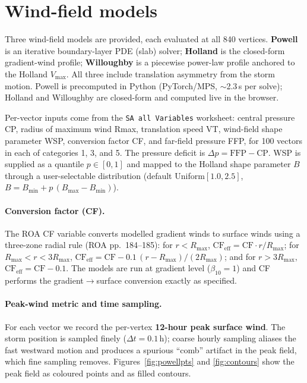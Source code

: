 \documentclass[11pt]{article}
\begin{document}
\section{Wind-field models}
Three wind-field models are provided, each evaluated at all 840 vertices.
\textbf{Powell} is an iterative boundary-layer PDE (slab) solver;
\textbf{Holland} is the closed-form gradient-wind profile; \textbf{Willoughby}
is a piecewise power-law profile anchored to the Holland $V_{\max}$. All three
include translation asymmetry from the storm motion. Powell is precomputed in
Python (PyTorch/MPS, $\sim$2.3\,s per solve); Holland and Willoughby are
closed-form and computed live in the browser.

Per-vector inputs come from the \texttt{SA all Variables} worksheet: central
pressure CP, radius of maximum wind Rmax, translation speed VT, wind-field shape
parameter WSP, conversion factor CF, and far-field pressure FFP, for 100 vectors
in each of categories 1, 3, and 5. The pressure deficit is $\Delta p=\text{FFP}-\text{CP}$.
WSP is supplied as a quantile $p\in[0,1]$ and mapped to the Holland shape
parameter $B$ through a user-selectable distribution (default Uniform$[1.0,2.5]$,
$B=B_{\min}+p\,(B_{\max}-B_{\min})$).

\paragraph{Conversion factor (CF).}
The ROA CF variable converts modelled gradient winds to surface winds using a
three-zone radial rule (ROA pp.~184--185): for $r<R_{\max}$,
$\text{CF}_{\text{eff}}=\text{CF}\cdot r/R_{\max}$; for
$R_{\max}\!<\!r\!<\!3R_{\max}$, $\text{CF}_{\text{eff}}=\text{CF}-0.1\,(r-R_{\max})/(2R_{\max})$;
and for $r>3R_{\max}$, $\text{CF}_{\text{eff}}=\text{CF}-0.1$. The models are run
at gradient level ($\beta_{10}=1$) and CF performs the gradient$\to$surface
conversion exactly as specified.

\paragraph{Peak-wind metric and time sampling.}
For each vector we record the per-vertex \textbf{12-hour peak surface wind}. The
storm position is sampled finely ($\Delta t=0.1$\,h); coarse hourly sampling
aliases the fast westward motion and produces a spurious ``comb'' artifact in the
peak field, which fine sampling removes. Figures~\ref{fig:powellpts} and
\ref{fig:contours} show the peak field as coloured points and as filled contours.
\end{document}
